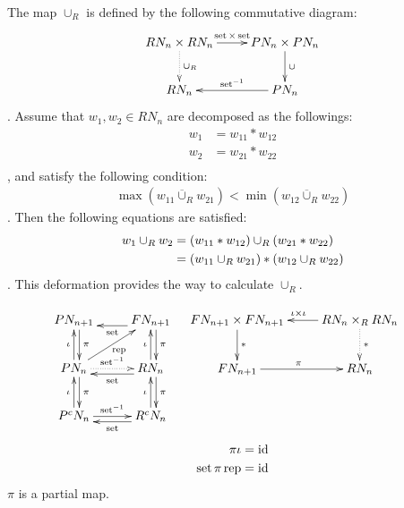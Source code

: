 The map $\cup_R$ is defined by the following commutative diagram:
\begin{equation}\xymatrix{
	RN_n\times RN_n \ar[r]^{\myop{set}\times\myop{set}} \ar@{.>}[d]^{\cup_R}
		& PN_n\times PN_n \ar[d]^{\cup} \\
	RN_n \ar@{<-}[r]^{\myop{set}^{-1}} & PN_n \\
}\end{equation}
. Assume that $w_1,w_2\in RN_n$ are decomposed as the followings:
\begin{equation}\begin{split}
	w_1 &= w_{11} * w_{12} \\
	w_2 &= w_{21} * w_{22} \\
\end{split}\end{equation}
, and satisfy the following condition:
\begin{equation}\begin{split}
	\max(w_{11} \overline{\cup}_R w_{21}) < \min(w_{12} \overline{\cup}_R w_{22})
\end{split}\end{equation}
. Then the following equations are satisfied:
\begin{equation}\begin{split}
	w_1 \cup_R w_2 &= \left({w_{11} * w_{12}}\right) \cup_R \left({w_{21} * w_{22}}\right) \\
		&= \left({w_{11} \cup_R w_{21}}\right) * \left({w_{12} \cup_R w_{22}}\right) \\
\end{split}\end{equation}
. This deformation provides the way to calculate $\cup_R$.

\begin{equation}\begin{split}
\xymatrix{
	PN_{n+1} \ar@<1ex>[d]^{\pi}
		& FN_{n+1} \ar@<1ex>[l]^{\myop{set}} \ar@<1ex>[d]^{\pi} \\
	PN_n \ar@{.>}[r]^{\myop{set}^{-1}} \ar[ur]_{\myop{rep}} \ar@<1ex>[d]^{\pi} \ar[u]^{\iota}
		& RN_n \ar@<1ex>[l]^{\myop{set}} \ar@<1ex>[d]^{\pi} \ar[u]^{\iota} \\
	P^cN_n \ar[r]^{\myop{set}^{-1}} \ar[u]^{\iota} 
		& R^cN_n \ar@<1ex>[l]^{\myop{set}} \ar[u]^{\iota} \\
} &\quad \xymatrix{
	FN_{n+1}\times FN_{n+1} \ar@{<-}[r]^{\iota\times \iota} \ar[d]^{*} 
		& RN_n\times_R RN_n \ar@{.>}[d]^{*} \\
	FN_{n+1} \ar[r]^{\pi} & RN_n \\
}
\end{split}\end{equation}
\begin{equation}\begin{split}
	\pi\iota &= \operatorname{id} \\
	\operatorname{set}\pi\operatorname{rep} &= \operatorname{id} \\
\end{split}\end{equation}
$\pi$ is a partial map.

